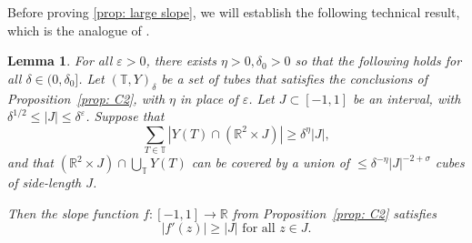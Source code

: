 \documentclass[letterpaper, reqno,11pt]{article}
\numberwithin{equation}{section}
\newcommand{\RR}{\mathbb{R}}
\newcommand{\TT}{\mathbb{T}}
\newcommand{\eps}{\varepsilon}
\numberwithin{thm}{section}
\newtheorem{lem}[thm]{Lemma}
\theoremstyle{remark}
\begin{document}
Before proving \ref{prop: large slope}, we will establish the following technical result, which is the analogue of \cite[Lemma 6.3]{WZ}. 
\begin{lem} \label{lem: large slope}
    For all $\eps>0$, there exists $\eta>0, \delta_0>0$ so that the following holds for all $\delta\in (0, \delta_0]$.  Let $(\TT, Y)_{\delta}$ be a set of tubes that satisfies the conclusions of Proposition~\ref{prop: C2}, with $\eta$ in place of $\eps$. Let $J\subset[-1,1]$ be an interval, with $\delta^{1/2}\leq |J|\leq \delta^{\eps}$. Suppose that 
    \begin{equation}\label{eq: dense}
        \sum_{T\in \TT} |Y(T)\cap (\RR^2\times J)|\geq \delta^{\eta} |J|,
    \end{equation}
    and that $(\RR^2\times J)\cap \bigcup_{\TT} Y(T)$ can be covered by a union of $\leq \delta^{-\eta}|J|^{-2+\sigma}$ cubes of side-length $J$. 

    Then the slope function $f: [-1,1]\rightarrow \RR$ from Proposition~\ref{prop: C2} satisfies 
    \[
    |f'(z)|\geq |J| \text{ for all } z\in J. 
    \]
\end{lem}
\end{document}
